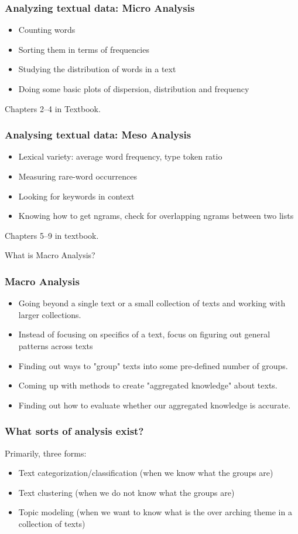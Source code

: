 \documentclass{beamer}
\begin{document}
\begin{frame}
\frametitle{Analyzing textual data: Micro Analysis}
\begin{itemize}
\item Counting words
\item Sorting them in terms of frequencies
\item Studying the distribution of words in a text 
\item Doing some basic plots of dispersion, distribution and frequency
\end{itemize}
Chapters 2--4 in Textbook.
\end{frame}

\begin{frame}
\frametitle{Analysing textual data: Meso Analysis}
\begin{itemize}
\item Lexical variety: average word frequency, type token ratio
\item Measuring rare-word occurrences
\item Looking for keywords in context
\item Knowing how to get ngrams, check for overlapping ngrams between two lists
\end{itemize}
Chapters 5--9 in textbook.
\end{frame}

\begin{frame}
\Large What is Macro Analysis?
\end{frame}

\begin{frame}
\frametitle{Macro Analysis}
\begin{itemize}
\item Going beyond a single text or a small collection of texts and working with larger collections.
\item Instead of focusing on specifics of a text, focus on figuring out general patterns across texts
\item Finding out ways to "group" texts into some pre-defined number of groups.  
\item Coming up with methods to create "aggregated knowledge" about texts.
\item Finding out how to evaluate whether our aggregated knowledge is accurate.
\end{itemize}
\end{frame}

\begin{frame}
\frametitle{What sorts of analysis exist?}
Primarily, three forms:
\begin{itemize}
\item Text categorization/classification (when we know what the groups are)
\item Text clustering (when we do not know what the groups are)
\item Topic modeling (when we want to know what is the over arching theme in a collection of texts)
\end{itemize}
\end{frame}
\end{document}
